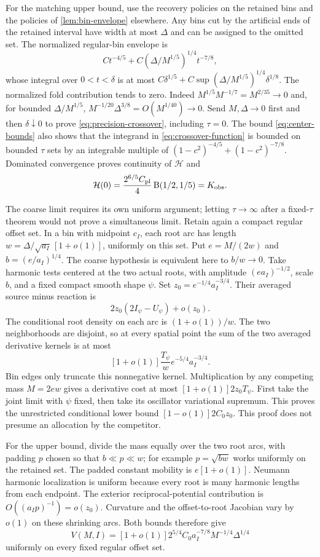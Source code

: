 For the matching upper bound, use the recovery policies on the
retained bins and the policies of \cref{lem:bin-envelope}
elsewhere. Any bins cut by the artificial ends of the retained
interval have width at most $\Delta$ and can be assigned to the
omitted set. The normalized regular-bin envelope is
\[
        Ct^{-4/5}
           +C(\Delta/M^{1/5})^{1/4}t^{-7/8},
\]
whose integral over $0<t<\delta$ is at most
$C\delta^{1/5}+C\sup(\Delta/M^{1/5})^{1/4}\delta^{1/8}$.
The normalized fold contribution tends to zero. Indeed
$M^{1/5}M^{-1/7}=M^{2/35}\to0$ and, for bounded
$\Delta/M^{1/5}$,
$M^{-1/20}\Delta^{3/8}=O(M^{1/40})\to0$.
Send $M,\Delta\to0$ first and then $\delta\downarrow0$ to
prove \eqref{eq:precision-crossover}, including $\tau=0$.
The bound \eqref{eq:center-bounds} also shows that the integrand
in \eqref{eq:crossover-function} is bounded on bounded $\tau$
sets by an integrable multiple of
$(1-c^2)^{-4/5}+(1-c^2)^{-7/8}$. Dominated convergence proves
continuity of $\mathcal H$ and
\[
 \mathcal H(0)=\frac{2^{6/5}C_{\rm pl}}4\operatorname{B}(1/2,1/5)
                    =K_{\rm obs}.
\]

The coarse limit requires its own uniform argument; letting
$\tau\to\infty$ after a fixed-$\tau$ theorem would not prove
a simultaneous limit. Retain again a compact regular offset
set. In a bin with midpoint $c_I$, each root arc has length
$w=\Delta/\sqrt{a_I}\,[1+o(1)]$, uniformly on this set.
Put $e=M/(2w)$ and $b=(e/a_I)^{1/4}$. The coarse hypothesis
is equivalent here to $b/w\to0$. Take harmonic tests centered
at the two actual roots, with amplitude $(e a_I)^{-1/2}$,
scale $b$, and a fixed compact smooth shape $\psi$. Set
$z_0=e^{-1/4}a_I^{-3/4}$. Their averaged source minus
reaction is
\[
       2z_0(2I_\psi-U_\psi)+o(z_0).
\]
The conditional root density on each arc is
$(1+o(1))/w$. The two neighborhoods are disjoint, so at every
spatial point the sum of the two averaged derivative kernels
is at most
\[
       [1+o(1)]\frac{T_\psi}{w}e^{-5/4}a_I^{-3/4}.
\]
Bin edges only truncate this nonnegative kernel. Multiplication
by any competing mass $M=2ew$ gives a derivative cost at most
$[1+o(1)]2z_0T_\psi$. First take the joint limit with $\psi$
fixed, then take its oscillator variational supremum. This proves
the unrestricted conditional lower bound $[1-o(1)]2C_0z_0$.
This proof does not presume an allocation by the competitor.

For the upper bound, divide the mass equally over the two root
arcs, with padding $p$ chosen so that $b\ll p\ll w$; for
example $p=\sqrt{bw}$ works uniformly on the retained set.
The padded constant mobility is $e[1+o(1)]$. Neumann harmonic
localization is uniform because every root is many harmonic
lengths from each endpoint. The exterior reciprocal-potential
contribution is $O((a_Ip)^{-1})=o(z_0)$. Curvature and the
offset-to-root Jacobian vary by $o(1)$ on these shrinking arcs.
Both bounds therefore give
\begin{equation}\label{eq:coarse-conditional}
 V(M,I)=[1+o(1)]2^{5/4}C_0a_I^{-7/8}
                               M^{-1/4}\Delta^{1/4}
\end{equation}
uniformly on every fixed regular offset set.

